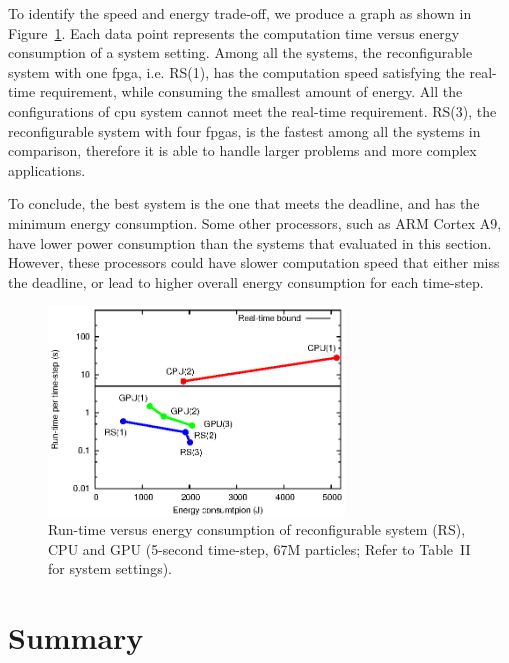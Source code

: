 To identify the speed and energy trade-off, we produce a graph as shown in Figure~\ref{fig:scale}. 
Each data point represents the computation time versus energy consumption of a system setting.
Among all the systems, the reconfigurable system with one \gls{fpga}, i.e. RS(1), has the computation speed satisfying the real-time requirement, while consuming the smallest amount of energy.
All the configurations of \gls{cpu} system cannot meet the real-time requirement.
RS(3), the reconfigurable system with four \glspl{fpga}, is the fastest among all the systems in comparison, therefore it is able to handle larger problems and more complex applications.

To conclude, the best system is the one that meets the deadline, and has the minimum energy consumption.
Some other processors, such as ARM Cortex A9, have lower power consumption than the systems that evaluated in this section.
However, these processors could have slower computation speed that either miss the deadline, or lead to higher overall energy consumption for each time-step.

\begin{figure}[t!]
\centering
\includegraphics[width=0.7\textwidth]{4_adaptation/figures/fig_scale}
\caption[Run-time versus energy consumption of reconfigurable system (RS), CPU and GPU]{Run-time versus energy consumption of reconfigurable system (RS), CPU and GPU (5-second time-step, 67M particles; Refer to Table~II for system settings).}
\label{fig:scale}
\end{figure}


\section{Summary}
\label{sec:reconfig_summary}

